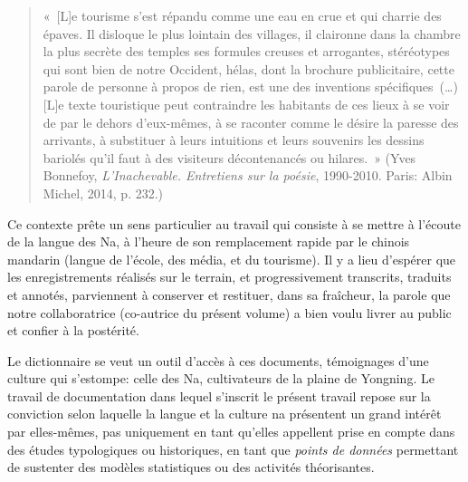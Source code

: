 \begin{quote}
    « [L]e tourisme s’est répandu comme une eau en crue et qui charrie des épaves. Il disloque le plus lointain des villages, il claironne dans la chambre la plus secrète des temples ses formules creuses et arrogantes, stéréotypes qui sont bien de notre Occident, hélas, dont la brochure publicitaire, cette parole de personne à propos de rien, est une des inventions spécifiques (…) [L]e texte touristique peut contraindre les habitants de ces lieux à se voir de par le dehors d'eux-mêmes, à se raconter comme le désire la paresse des arrivants, à substituer à leurs intuitions et leurs souvenirs les dessins bariolés qu'il faut à des visiteurs décontenancés ou hilares. » (Yves Bonnefoy, \emph{L'Inachevable. Entretiens sur la poésie}, 1990-2010. Paris: Albin Michel, 2014, p. 232.)
\end{quote}

Ce contexte prête un sens particulier au travail qui consiste à se mettre à l’écoute de la langue des Na, à l’heure de son remplacement rapide par le chinois mandarin (langue de l’école, des média, et du tourisme). Il y a lieu d'espérer que les enregistrements réalisés sur le terrain, et progressivement transcrits, traduits et annotés, parviennent à conserver et restituer, dans sa fraîcheur, la parole que notre collaboratrice (co-autrice du présent volume) a bien voulu livrer au public et confier à la postérité.

Le dictionnaire se veut un outil d'accès à ces documents, témoignages d’une culture qui s’estompe: celle des Na, cultivateurs de la plaine de Yongning. Le travail de documentation dans lequel s'inscrit le présent travail repose sur la conviction selon laquelle la langue et la culture na présentent un grand intérêt par elles-mêmes, pas uniquement en tant qu'elles appellent prise en compte dans des études typologiques ou historiques, en tant que \emph{points de données} permettant de sustenter des modèles statistiques ou des activités théorisantes.

